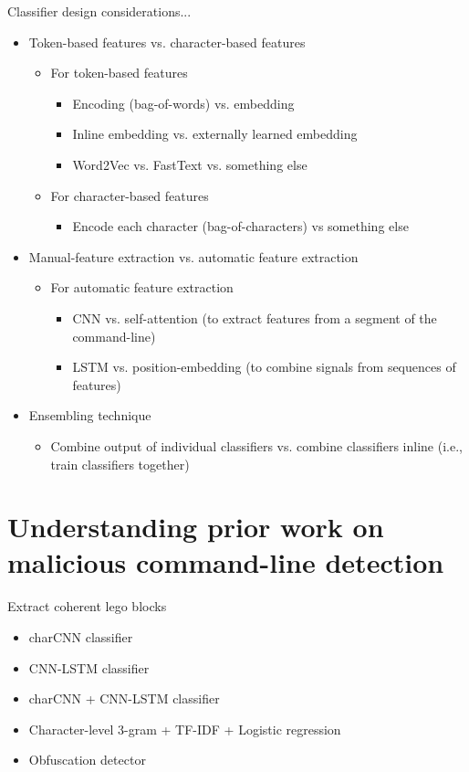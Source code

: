 \documentclass[10pt]{beamer}
\begin{document}
\begin{frame}{Classifier design considerations...}
	\begin{itemize}
		\item Token-based features vs. character-based features
		\begin{itemize}
			\item For token-based features
			\begin{itemize}
				\item Encoding (bag-of-words) vs. embedding
				\item Inline embedding vs. externally learned embedding
				\item Word2Vec vs. FastText vs. something else
			\end{itemize}
			\item For character-based features
			\begin{itemize}
				\item Encode each character (bag-of-characters) vs something else
			\end{itemize}
		\end{itemize}
		\item Manual-feature extraction vs. automatic feature extraction
		\begin{itemize}
			\item For automatic feature extraction
			\begin{itemize}
				\item CNN vs. self-attention (to extract features from a segment of the command-line)
				\item LSTM vs. position-embedding (to combine signals from sequences of features)
			\end{itemize}
		\end{itemize}
		\item Ensembling technique
		\begin{itemize}
			\item Combine output of individual classifiers vs. combine classifiers inline (i.e., train classifiers together)
		\end{itemize}
	\end{itemize}
\end{frame}

\section{Understanding prior work on malicious command-line detection}

\begin{frame}[fragile]{Extract coherent lego blocks}
	\begin{itemize}
		\item charCNN classifier \cite{charcnn2016,charcnn2019,powershell2018}
		\item CNN-LSTM classifier \cite{amsi2019}
		\item charCNN + CNN-LSTM classifier \cite{amsi2019}
		\item Character-level 3-gram + TF-IDF + Logistic regression \cite{amsi2019}
		\item Obfuscation detector \cite{feye2018}
	\end{itemize}
\end{frame}
\end{document}
